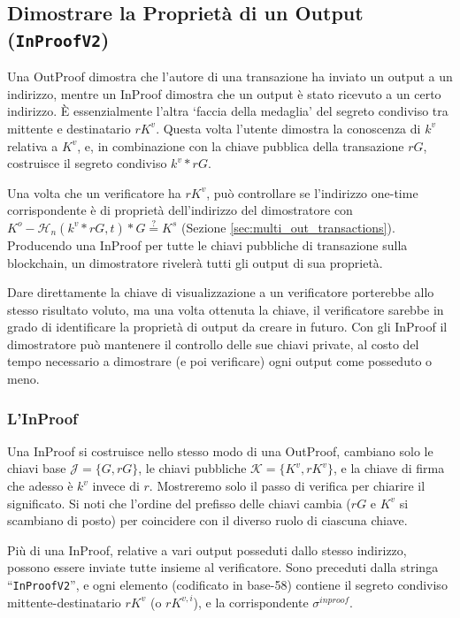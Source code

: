 \subsection{Dimostrare la Proprietà di un Output ({\tt InProofV2})}
\label{subsec:proofs-output-ownership-inproof}

Una OutProof dimostra che l'autore di una transazione ha inviato un output a un indirizzo, mentre un InProof dimostra che un output è stato ricevuto a un certo indirizzo. È essenzialmente l’altra `faccia della medaglia’ del segreto condiviso tra mittente e destinatario $r K^v$. Questa volta l'utente dimostra la conoscenza di $k^v$ relativa a $K^v$, e, in combinazione con la chiave pubblica della transazione $r G$, costruisce il segreto condiviso $k^v*r G$.

Una volta che un verificatore ha $r K^v$, può controllare se l’indirizzo one-time corrispondente è di proprietà dell’indirizzo del dimostratore con $K^o - \mathcal{H}_n(k^v*rG,t)*G \stackrel{?}{=} K^s$ (Sezione \ref{sec:multi_out_transactions}). Producendo una InProof per tutte le chiavi pubbliche di transazione sulla blockchain, un dimostratore rivelerà tutti gli output di sua proprietà.

Dare direttamente la chiave di visualizzazione a un verificatore porterebbe allo stesso risultato voluto, ma una volta ottenuta la chiave, il verificatore sarebbe in grado di identificare la proprietà di output da creare in futuro. Con gli InProof il dimostratore può mantenere il controllo delle sue chiavi private, al costo del tempo necessario a dimostrare (e poi verificare) ogni output come posseduto o meno.

\subsubsection*{L’InProof}

Una InProof si costruisce nello stesso modo di una OutProof, cambiano solo le chiavi base $\mathcal{J} = \{G, r G\}$, le chiavi pubbliche $\mathcal{K} = \{K^v, r K^{v}\}$, e la chiave di firma che adesso è $k^v$ invece di $r$. Mostreremo solo il passo di verifica per chiarire il significato. Si noti che l’ordine del prefisso delle chiavi cambia ($r G$ e $K^v$ si scambiano di posto) per coincidere con il diverso ruolo di ciascuna chiave.

Più di una InProof, relative a vari output posseduti dallo stesso indirizzo, possono essere inviate tutte insieme al verificatore. Sono preceduti dalla stringa ``{\tt InProofV2}'', e ogni elemento (codificato in base-58) contiene il segreto condiviso mittente-destinatario $r K^v$ (o $r K^{v,i}$), e la corrispondente $\sigma^{inproof}$.

